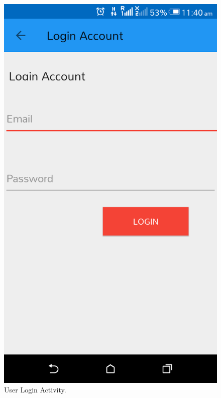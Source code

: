 \begin{appendices}
\begin{figure}[!ht]
	\centering
	\includegraphics[scale=0.2]{login-page.png}
	\caption{\label{img20}  User Login Activity.}
\end{figure}


\end{appendices}
